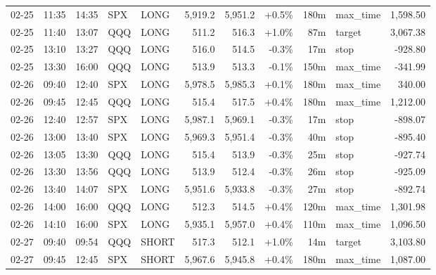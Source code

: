 \documentclass[11pt,a4paper,twoside]{article}
\begin{document}
\begin{center}
\begin{longtable}{>{\color{txtmain}}l l l l l r r r r >{\color{txtmain}}l r}
02-25 & 11:35 & 14:35 & SPX & LONG & 5,919.2 & 5,951.2 & \textcolor{wingreen}{+0.5\%} & 180m & max\_time & \textcolor{wingreen}{1,598.50} \\
02-25 & 11:40 & 13:07 & QQQ & LONG & 511.2 & 516.3 & \textcolor{wingreen}{+1.0\%} & 87m & target & \textcolor{wingreen}{3,067.38} \\
02-25 & 13:10 & 13:27 & QQQ & LONG & 516.0 & 514.5 & \textcolor{lossred}{-0.3\%} & 17m & stop & \textcolor{lossred}{-928.80} \\
02-25 & 13:30 & 16:00 & QQQ & LONG & 513.9 & 513.3 & \textcolor{lossred}{-0.1\%} & 150m & max\_time & \textcolor{lossred}{-341.99} \\
02-26 & 09:40 & 12:40 & SPX & LONG & 5,978.5 & 5,985.3 & \textcolor{wingreen}{+0.1\%} & 180m & max\_time & \textcolor{wingreen}{340.00} \\
02-26 & 09:45 & 12:45 & QQQ & LONG & 515.4 & 517.5 & \textcolor{wingreen}{+0.4\%} & 180m & max\_time & \textcolor{wingreen}{1,212.00} \\
02-26 & 12:40 & 12:57 & SPX & LONG & 5,987.1 & 5,969.1 & \textcolor{lossred}{-0.3\%} & 17m & stop & \textcolor{lossred}{-898.07} \\
02-26 & 13:00 & 13:40 & SPX & LONG & 5,969.3 & 5,951.4 & \textcolor{lossred}{-0.3\%} & 40m & stop & \textcolor{lossred}{-895.40} \\
02-26 & 13:05 & 13:30 & QQQ & LONG & 515.4 & 513.9 & \textcolor{lossred}{-0.3\%} & 25m & stop & \textcolor{lossred}{-927.74} \\
02-26 & 13:30 & 13:56 & QQQ & LONG & 513.9 & 512.4 & \textcolor{lossred}{-0.3\%} & 26m & stop & \textcolor{lossred}{-925.09} \\
02-26 & 13:40 & 14:07 & SPX & LONG & 5,951.6 & 5,933.8 & \textcolor{lossred}{-0.3\%} & 27m & stop & \textcolor{lossred}{-892.74} \\
02-26 & 14:00 & 16:00 & QQQ & LONG & 512.3 & 514.5 & \textcolor{wingreen}{+0.4\%} & 120m & max\_time & \textcolor{wingreen}{1,301.98} \\
02-26 & 14:10 & 16:00 & SPX & LONG & 5,935.1 & 5,957.0 & \textcolor{wingreen}{+0.4\%} & 110m & max\_time & \textcolor{wingreen}{1,096.50} \\
02-27 & 09:40 & 09:54 & QQQ & SHORT & 517.3 & 512.1 & \textcolor{wingreen}{+1.0\%} & 14m & target & \textcolor{wingreen}{3,103.80} \\
02-27 & 09:45 & 12:45 & SPX & SHORT & 5,967.6 & 5,945.8 & \textcolor{wingreen}{+0.4\%} & 180m & max\_time & \textcolor{wingreen}{1,087.00} \\

\end{longtable}
\end{center}
\end{document}
